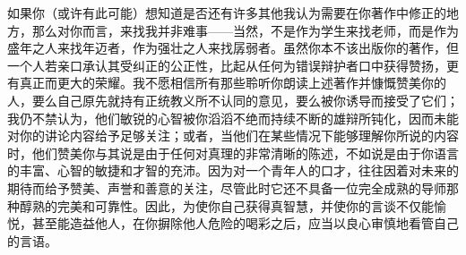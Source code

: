 如果你（或许有此可能）想知道是否还有许多其他我认为需要在你著作中修正的地方，那么对你而言，来找我并非难事——当然，不是作为学生来找老师，而是作为盛年之人来找年迈者，作为强壮之人来找孱弱者。虽然你本不该出版你的著作，但一个人若亲口承认其受纠正的公正性，比起从任何为错误辩护者口中获得赞扬，更有真正而更大的荣耀。我不愿相信所有那些聆听你朗读上述著作并慷慨赞美你的人，要么自己原先就持有正统教义所不认同的意见，要么被你诱导而接受了它们；我仍不禁认为，他们敏锐的心智被你滔滔不绝而持续不断的雄辩所钝化，因而未能对你的讲论内容给予足够关注；或者，当他们在某些情况下能够理解你所说的内容时，他们赞美你与其说是由于任何对真理的非常清晰的陈述，不如说是由于你语言的丰富、心智的敏捷和才智的充沛。因为对一个青年人的口才，往往因着对未来的期待而给予赞美、声誉和善意的关注，尽管此时它还不具备一位完全成熟的导师那种醇熟的完美和可靠性。因此，为使你自己获得真智慧，并使你的言谈不仅能愉悦，甚至能造益他人，在你摒除他人危险的喝彩之后，应当以良心审慎地看管自己的言语。\par

